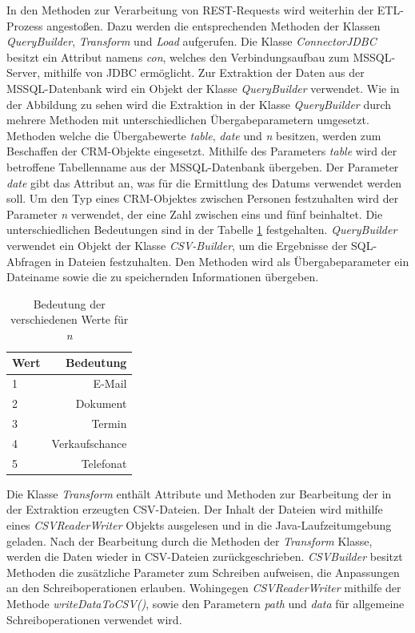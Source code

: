 In den Methoden zur Verarbeitung von REST-Requests wird weiterhin der ETL-Prozess angestoßen. Dazu werden die entsprechenden Methoden der Klassen \textit{QueryBuilder}, \textit{Transform} und \textit{Load} aufgerufen. Die Klasse  \textit{ConnectorJDBC} besitzt ein Attribut namens \textit{con}, welches den Verbindungsaufbau zum MSSQL-Server, mithilfe von JDBC ermöglicht. Zur Extraktion der Daten aus der MSSQL-Datenbank wird ein Objekt der Klasse \textit{QueryBuilder} verwendet. Wie in der Abbildung zu sehen wird die Extraktion in der Klasse \textit{QueryBuilder} durch mehrere Methoden mit unterschiedlichen Übergabeparametern umgesetzt. Methoden welche die Übergabewerte \textit{table}, \textit{date} und \textit{n} besitzen, werden zum Beschaffen der CRM-Objekte eingesetzt. Mithilfe des Parameters \textit{table} wird der betroffene Tabellenname aus der MSSQL-Datenbank übergeben. Der Parameter \textit{date} gibt das Attribut an, was für die Ermittlung des Datums verwendet werden soll. Um den Typ eines CRM-Objektes zwischen Personen festzuhalten wird der Parameter \textit{n} verwendet, der eine Zahl zwischen eins und fünf beinhaltet. Die unterschiedlichen Bedeutungen sind in der Tabelle \ref{tb:BedeutungDerZahlenQueryBuilder} festgehalten. \textit{QueryBuilder} verwendet ein Objekt der Klasse \textit{CSV-Builder}, um die Ergebnisse der SQL-Abfragen in Dateien festzuhalten. Den Methoden wird als Übergabeparameter ein Dateiname sowie die zu speichernden Informationen übergeben.

\begin{table}[htbp]
\centering
\begin{tabular} {l | r}
Wert & Bedeutung  \\ \hline
1 & E-Mail \\
2 & Dokument \\
3 & Termin \\
4 & Verkaufschance \\
5 & Telefonat \\
\end{tabular}
\caption{Bedeutung der verschiedenen Werte für \textit{n}}
\label{tb:BedeutungDerZahlenQueryBuilder}
\end{table}


Die Klasse \textit{Transform} enthält Attribute und Methoden zur Bearbeitung der in der Extraktion erzeugten CSV-Dateien. Der Inhalt der Dateien wird mithilfe eines \textit{CSVReaderWriter} Objekts ausgelesen und in die Java-Laufzeitumgebung geladen. Nach der Bearbeitung durch die Methoden der \textit{Transform} Klasse, werden die Daten wieder in CSV-Dateien zurückgeschrieben. \textit{CSVBuilder} besitzt Methoden die zusätzliche Parameter zum Schreiben aufweisen, die Anpassungen an den Schreiboperationen erlauben. Wohingegen \textit{CSVReaderWriter} mithilfe der Methode \textit{writeDataToCSV()}, sowie den Parametern \textit{path} und \textit{data} für allgemeine Schreiboperationen verwendet wird.

